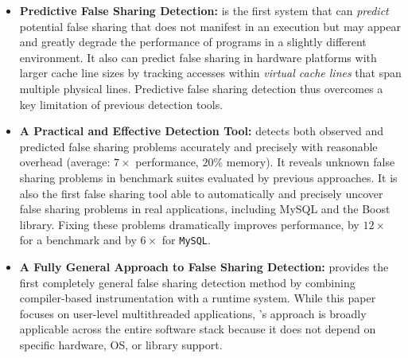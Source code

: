 \begin{itemize}


\item
\textbf{Predictive False Sharing Detection:} \Predator{} is the first system that can \emph{predict} potential false sharing that does
not manifest in an execution but may appear and greatly degrade the
performance of programs in a slightly different
environment. 
It also can predict false sharing
in hardware platforms with larger cache line sizes by tracking
accesses within \emph{virtual cache lines} that span multiple physical lines. Predictive false sharing detection thus overcomes a key limitation of previous detection tools.



\item
\textbf{A Practical and Effective Detection Tool:} \Predator{} detects both observed and predicted false sharing 
problems accurately and precisely with reasonable overhead (average:
$7\times$ performance, $20\%$ memory).  It reveals unknown false
sharing problems in benchmark suites evaluated by previous approaches. It
is also the first false sharing tool able to automatically and precisely uncover
false sharing problems in real applications, including 
MySQL and the Boost library. Fixing these problems 
dramatically improves performance, by $12\times$ for a benchmark and by $6\times$ for \texttt{MySQL}.


\item
\textbf{A Fully General Approach to False Sharing Detection:} \Predator{} provides the first completely general false sharing detection method by
combining compiler-based instrumentation with a runtime system. While this
paper focuses on user-level multithreaded applications, \Predator{}'s
approach is broadly applicable across the entire software stack
because it does not depend on specific hardware, OS, or library
support.


\end{itemize}
